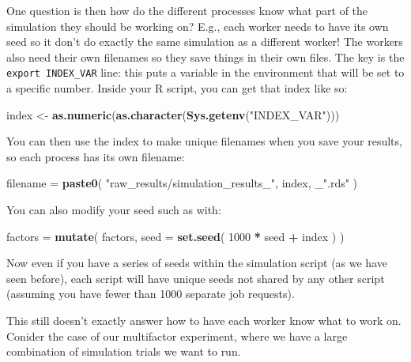 \documentclass[
]{book}
\newenvironment{Shaded}{\begin{snugshade}}{\end{snugshade}}
\newcommand{\AttributeTok}[1]{\textcolor[rgb]{0.13,0.29,0.53}{#1}}
\newcommand{\DecValTok}[1]{\textcolor[rgb]{0.00,0.00,0.81}{#1}}
\newcommand{\FunctionTok}[1]{\textcolor[rgb]{0.13,0.29,0.53}{\textbf{#1}}}
\newcommand{\NormalTok}[1]{#1}
\newcommand{\OtherTok}[1]{\textcolor[rgb]{0.56,0.35,0.01}{#1}}
\newcommand{\SpecialCharTok}[1]{\textcolor[rgb]{0.81,0.36,0.00}{\textbf{#1}}}
\newcommand{\StringTok}[1]{\textcolor[rgb]{0.31,0.60,0.02}{#1}}
\begin{document}
One question is then how do the different processes know what part of the simulation they should be working on?
E.g., each worker needs to have its own seed so it don't do exactly the same simulation as a different worker!
The workers also need their own filenames so they save things in their own files.
The key is the \texttt{export\ INDEX\_VAR} line: this puts a variable in the environment that will be set to a specific number.
Inside your R script, you can get that index like so:

\begin{Shaded}
\begin{Highlighting}[]
\NormalTok{index }\OtherTok{\textless{}{-}} \FunctionTok{as.numeric}\NormalTok{(}\FunctionTok{as.character}\NormalTok{(}\FunctionTok{Sys.getenv}\NormalTok{(}\StringTok{"INDEX\_VAR"}\NormalTok{)))}
\end{Highlighting}
\end{Shaded}

You can then use the index to make unique filenames when you save your results, so each process has its own filename:

\begin{Shaded}
\begin{Highlighting}[]
\NormalTok{filename }\OtherTok{=} \FunctionTok{paste0}\NormalTok{( }\StringTok{"raw\_results/simulation\_results\_"}\NormalTok{, index, \_}\StringTok{".rds"}\NormalTok{ )}
\end{Highlighting}
\end{Shaded}

You can also modify your seed such as with:

\begin{Shaded}
\begin{Highlighting}[]
\NormalTok{factors }\OtherTok{=} \FunctionTok{mutate}\NormalTok{( factors,}
                  \AttributeTok{seed =} \FunctionTok{set.seed}\NormalTok{( }\DecValTok{1000} \SpecialCharTok{*}\NormalTok{ seed }\SpecialCharTok{+}\NormalTok{ index ) )}
\end{Highlighting}
\end{Shaded}

Now even if you have a series of seeds within the simulation script (as we have seen before), each script will have unique seeds not shared by any other script (assuming you have fewer than 1000 separate job requests).

This still doesn't exactly answer how to have each worker know what to work on.
Conider the case of our multifactor experiment, where we have a large combination of simulation trials we want to run.
\end{document}
